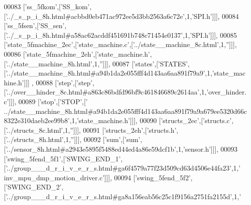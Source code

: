 \begin{DoxyCode}
00083   [\textcolor{stringliteral}{'ss\_5fkom'},[\textcolor{stringliteral}{'SS\_kom'},[\textcolor{stringliteral}{'../\_s\_p\_i\_8h.html#acbbd0eb471ac972ee5d3bb2563a6c72e'},1,\textcolor{stringliteral}{'SPI.h'}]]],
00084   [\textcolor{stringliteral}{'ss\_5fsen'},[\textcolor{stringliteral}{'SS\_sen'},[\textcolor{stringliteral}{'../\_s\_p\_i\_8h.html#a58ac62acddf451691b748c71454e0137'},1,\textcolor{stringliteral}{'SPI.h'}]]],
00085   [\textcolor{stringliteral}{'state\_5fmachine\_2ec'},[\textcolor{stringliteral}{'state\_machine.c'},[\textcolor{stringliteral}{'../state\_\_machine\_8c.html'},1,\textcolor{stringliteral}{''}]]],
00086   [\textcolor{stringliteral}{'state\_5fmachine\_2eh'},[\textcolor{stringliteral}{'state\_machine.h'},[\textcolor{stringliteral}{'../state\_\_machine\_8h.html'},1,\textcolor{stringliteral}{''}]]],
00087   [\textcolor{stringliteral}{'states'},[\textcolor{stringliteral}{'STATES'},[\textcolor{stringliteral}{'../state\_\_machine\_8h.html#a94b1da2e055fff4d143aa6aa891f79a9'},1,\textcolor{stringliteral}{'state\_machine.h'}]]]
      ,
00088   [\textcolor{stringliteral}{'step'},[\textcolor{stringliteral}{'step'},[\textcolor{stringliteral}{'../over\_\_hinder\_8c.html#a863c86bdfd96bf9c461846689c2614aa'},1,\textcolor{stringliteral}{'over\_hinder.c'}]]],
00089   [\textcolor{stringliteral}{'stop'},[\textcolor{stringliteral}{'STOP'},[\textcolor{stringliteral}{'
      ../state\_\_machine\_8h.html#a94b1da2e055fff4d143aa6aa891f79a9a679ee5320d66c8322e310daeb2ee99b8'},1,\textcolor{stringliteral}{'state\_machine.h'}]]],
00090   [\textcolor{stringliteral}{'structs\_2ec'},[\textcolor{stringliteral}{'structs.c'},[\textcolor{stringliteral}{'../structs\_8c.html'},1,\textcolor{stringliteral}{''}]]],
00091   [\textcolor{stringliteral}{'structs\_2eh'},[\textcolor{stringliteral}{'structs.h'},[\textcolor{stringliteral}{'../structs\_8h.html'},1,\textcolor{stringliteral}{''}]]],
00092   [\textcolor{stringliteral}{'sum'},[\textcolor{stringliteral}{'sum'},[\textcolor{stringliteral}{'../sensor\_8h.html#a2943e5895f5488ed44ed4a86e59dcf1b'},1,\textcolor{stringliteral}{'sensor.h'}]]],
00093   [\textcolor{stringliteral}{'swing\_5fend\_5f1'},[\textcolor{stringliteral}{'SWING\_END\_1'},[\textcolor{stringliteral}{'../group\_\_\_d\_r\_i\_v\_e\_r\_s.html#ga6f4579a77f23d509cd63d4506e44fa23'},1,\textcolor{stringliteral}{'
      inv\_mpu\_dmp\_motion\_driver.c'}]]],
00094   [\textcolor{stringliteral}{'swing\_5fend\_5f2'},[\textcolor{stringliteral}{'SWING\_END\_2'},[\textcolor{stringliteral}{'../group\_\_\_d\_r\_i\_v\_e\_r\_s.html#ga8a156eab56c25c1f9156a2751fa2155d'},1,\textcolor{stringliteral}{'
}
\end{DoxyCode}
